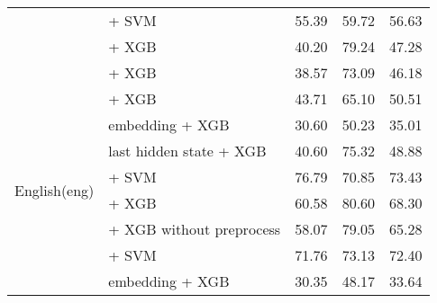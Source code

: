 \begin{longtable}{p{4cm}p{6cm}ccc}
                                          & \citep{sturua2024jinaembeddingsv3multilingualembeddingstask} + SVM     & 55.39                                & 59.72              & 56.63             \\
                                          & \citep{ni2021sentencet5scalablesentenceencoders} + XGB                 & 40.20                                & 79.24              & 47.28             \\
                                          & \citep{wang2023improving} + XGB                                        & 38.57                                & 73.09              & 46.18             \\
    \midrule
    \multirow{16}{*}{English(eng)}        & \citep{all-MiniLM-L12-v2}  + XGB                                       & 43.71                                & 65.10              & 50.51             \\
                                          & \citep{DBLP:journals/corr/abs-1810-04805} embedding + XGB              & 30.60                                & 50.23              & 35.01             \\
                                          & \citep{DBLP:journals/corr/abs-1810-04805} last hidden state + XGB      & 40.60                                & 75.32              & 48.88             \\
                                          & \citep{wang2024multilingual} + SVM                                     & 76.79                                & 70.85              & 73.43             \\
                                          & \citep{zhang2025jasperstelladistillationsota} + XGB                    & 60.58                                & 80.60              & 68.30             \\
                                          & \citep{zhang2025jasperstelladistillationsota} + XGB without preprocess & 58.07                                & 79.05              & 65.28             \\
                                          & \citep{zhang2025jasperstelladistillationsota} + SVM                    & 71.76                                & 73.13              & 72.40             \\
                                          & \citep{DBLP:journals/corr/abs-1907-11692} embedding + XGB              & 30.35                                & 48.17              & 33.64             \\

\end{longtable}
